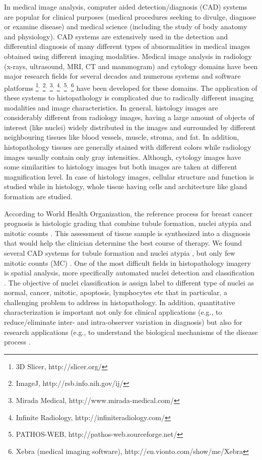 \documentclass[10pt,twocolumn,letterpaper]{article}
\begin{document}
In medical image analysis, computer aided detection/diagnosis (CAD) systems are popular for clinical purposes (medical procedures seeking to divulge, diagnose or examine disease) and medical science (including the study of body anatomy and physiology). CAD systems are extensively used in the detection and differential diagnosis of many different types of abnormalities in medical images obtained using different imaging modalities. Medical image analysis in radiology (x-rays, ultrasound, MRI, CT and mammogram) and cytology domains have been major research fields for several decades and numerous systems \cite{sonka2000, erickson2002, summers2003, giger2004, bankman2008, he2009, plissiti2013} and software platforms
\footnote{3D Slicer, http://slicer.org/}$^,$
\footnote{ImageJ, http://rsb.info.nih.gov/ij/}$^,$
\footnote{Mirada Medical, http://www.mirada-medical.com/}$^,$
\footnote{Infinite Radiology, http://infiniteradiology.com/}$^,$
\footnote{PATHOS-WEB, http://pathos-web.sourceforge.net/}$^,$
\footnote{Xebra (medical imaging software), http://en.vionto.com/show/me/Xebra}
 have been developed for these domains. The application of these systems to histopathology is complicated due to radically different imaging modalities and image characteristics. In general, histology images are considerably different from radiology images, having a large amount of objects of interest (like nuclei) widely distributed in the images and surrounded by different neighbouring tissues like blood vessels, muscle, stroma, and fat. In addition, histopathology tissues are generally stained with different colors while radiology images usually contain only gray intensities. Although, cytology images have some similarities to histology images but both images are taken at different magnification level. In case of histology images, cellular structure and function is studied while in histology, whole tissue having cells and architecture like gland formation are studied.
 
According to World Health Organization, the reference process for breast cancer prognosis is histologic grading that combine tubule formation, nuclei atypia and mitotic counts \cite{bloom1957, elston1993}. This assessment of tissue sample is synthesized into a diagnosis that would help the clinician determine the best course of therapy. We found several CAD systems for tubule formation \cite{petushi2006, naik2008} and nuclei atypia \cite{cosatto2008, dalle2009, chaudhury2011, dundar2011}, but only few mitotic counts (MC) \cite{irshad2013a, irshad2013b}. One of the most difficult fields in histopathology imagery is spatial analysis, more specifically automated nuclei detection and classification \cite{fuchs2011}. The objective of nuclei classification is assign label to different type of nuclei as normal, cancer, mitotic, apoptosis, lymphocytes etc that in particular, a challenging problem to address in histopathology. In addition, quantitative characterization is important not only for clinical applications (e.g., to reduce/eliminate inter- and intra-observer variation in diagnosis) but also for research applications (e.g., to understand the biological mechanisms of the disease process \cite{gurcan2009}.
\end{document}
